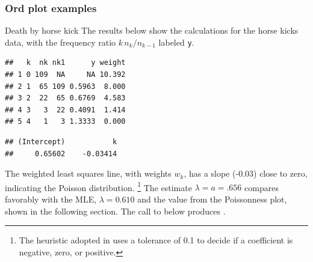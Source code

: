 \documentclass[11pt]{book}
\renewenvironment{knitrout}{\small\renewcommand{\baselinestretch}{.85}}{} %
\begin{document}

\subsubsection{Ord plot examples}
\begin{Example}[horskick3]{Death by horse kick}
The results below show the calculations for
the horse kicks data, with the frequency ratio \({ k \,  n_k } /  { n_{k-1}
}\) labeled \texttt{y}.  

\begin{knitrout}
\color{fgcolor}\begin{kframe}
\begin{alltt}
 \hlstd{=}\hlstd{)}
 \hlkwb{<-} 
 \hlkwb{<-} \hlstd{(}
 \hlkwb{<-} \hlstd{(}\hlstd{, nk[}\hlopt{-}\hlstd{(nk)])}
 \hlkwb{<-}  \hlopt{*} \hlopt{/}
 \hlkwb{=} \hlstd{(} \hlstd{)} \hlopt{-} \hlstd{)}
 \hlkwb{<-} 
\end{alltt}
\begin{verbatim}
##   k  nk nk1      y weight
## 1 0 109  NA     NA 10.392
## 2 1  65 109 0.5963  8.000
## 3 2  22  65 0.6769  4.583
## 4 3   3  22 0.4091  1.414
## 5 4   1   3 1.3333  0.000
\end{verbatim}
\begin{alltt}
\hlstd{(} \hlopt{~}   
\end{alltt}
\begin{verbatim}
## (Intercept)           k 
##     0.65602    -0.03414
\end{verbatim}
\end{kframe}
\end{knitrout}

The weighted least squares line, with weights
\(w_k\), has a slope (-0.03) close to zero, indicating the Poisson
distribution.%
\footnote{
The heuristic adopted in  uses a tolerance of 0.1
to decide if a coefficient is negative, zero, or positive.
}
The estimate \(\lambda = a = .656\) compares
favorably with the MLE, $\lambda=0.610$ and the
value from the Poissonness plot, shown in the
following section.  The call to  below
produces .


\end{Example}
\end{document}
